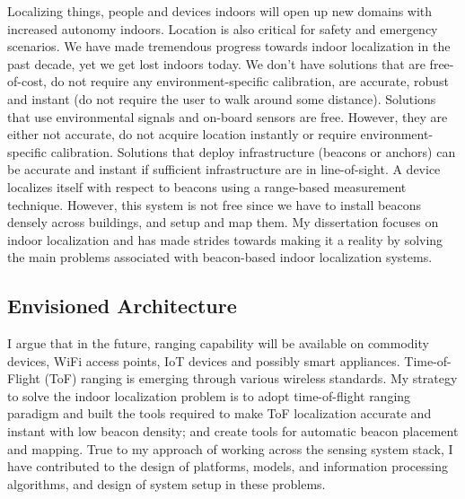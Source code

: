 \documentclass[10pt]{article}
\begin{document}
Localizing things, people and devices indoors will open up new domains with increased autonomy indoors. %
Location is also critical for safety and emergency scenarios. %
We have made tremendous progress towards indoor localization in the past decade, yet we get lost indoors today.  %
We don't have solutions that are free-of-cost, do not require any environment-specific calibration, are accurate, robust and instant (do not require the user to walk around some distance). Solutions that use environmental signals and on-board sensors are free. However, they are either not accurate, do not acquire location instantly or require environment-specific calibration. Solutions that deploy infrastructure (beacons or anchors) can be accurate and instant if sufficient infrastructure  are in line-of-sight. A device localizes itself with respect to beacons using a range-based measurement technique. %
However, this system is not free since we have to install beacons densely across buildings, and setup and map them. My dissertation focuses on indoor localization and has made %
strides towards making it a reality by solving the main problems associated with beacon-based indoor localization systems.\\

\subsection{Envisioned Architecture}
I argue that in the future, ranging capability will be available on commodity devices, WiFi access points, IoT devices and possibly smart appliances. 
Time-of-Flight (ToF) ranging is emerging through various wireless standards. My strategy to solve the indoor localization problem is to adopt time-of-flight ranging paradigm and built the tools required to make ToF localization accurate and instant with low beacon density; and create tools for automatic beacon placement and mapping. True to my approach of working across the sensing system stack, I have contributed to the design of platforms, models, and information processing algorithms, and design of system setup in these problems.\\
\end{document}
